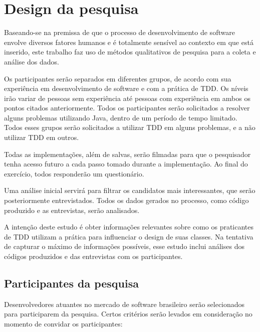 \section{Design da pesquisa}

Baseando-se na premissa de que o processo de desenvolvimento de software envolve 
diversos fatores humanos e é totalmente sensível ao contexto em que está 
inserido, este trabalho faz uso de métodos qualitativos de pesquisa para a coleta e 
análise dos dados.

Os participantes serão separados em diferentes grupos, de acordo com sua
experiência em desenvolvimento de software e com a prática de TDD. Os níveis
irão variar de pessoas sem experiência até pessoas com experiência em ambos
os pontos citados anteriormente.
Todos os participantes serão
solicitados a resolver alguns problemas utilizando Java, dentro de um
período de tempo limitado. Todos esses grupos
serão solicitados a utilizar TDD em alguns problemas, e a não utilizar
TDD em outros.

Todas as implementações,
além de salvas, serão filmadas para que o pesquisador tenha acesso futuro
a cada passo tomado durante a implementação.
Ao final do exercício,
todos responderão um questionário.

Uma análise inicial servirá para filtrar os candidatos
mais interessantes, que serão posteriormente entrevistados. 
Todos os dados gerados no processo,
como código produzido e as entrevistas, serão analisados.

A intenção deste estudo é obter informações relevantes sobre como os
praticantes de TDD utilizam a prática para influenciar o design de suas
classes. Na tentativa de capturar o máximo de informações possíveis, esse estudo
inclui análises dos códigos produzidos e das entrevistas com os participantes.

\subsection{Participantes da pesquisa}
\label{sec:planejamento-participantes}

Desenvolvedores atuantes no mercado de 
software brasileiro serão selecionados para participarem da pesquisa.
Certos critérios serão levados em consideração no momento de convidar os participantes:

